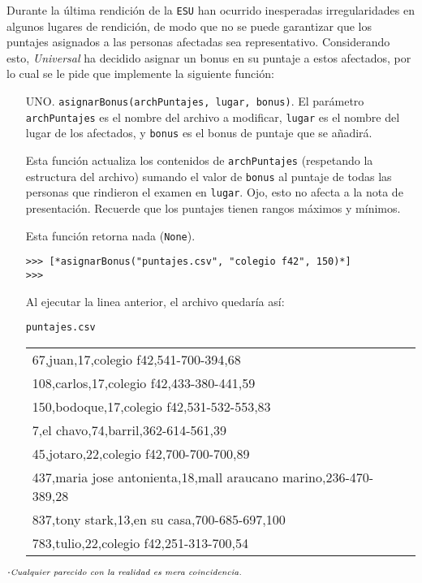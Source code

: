 Durante la última rendición de la \texttt{ESU} han ocurrido inesperadas irregularidades en algunos lugares de rendición, de modo que no se puede garantizar que los puntajes asignados a las personas afectadas sea representativo. Considerando esto, \textit{Universal} ha decidido asignar un bonus en su puntaje a estos afectados, por lo cual se le pide que implemente la siguiente función:
\begin{enumerate}
    \item[UNO.] \texttt{asignarBonus(archPuntajes, lugar, bonus)}. El parámetro \texttt{archPuntajes} es el nombre del archivo a modificar, \texttt{lugar} es el nombre del lugar de los afectados, y \texttt{bonus} es el bonus de puntaje que se añadirá.
    
    Esta función actualiza los contenidos de \texttt{archPuntajes} (respetando la estructura del archivo) sumando el valor de \texttt{bonus} al puntaje de todas las personas que rindieron el examen en \texttt{lugar}. Ojo, esto no afecta a la nota de presentación. Recuerde que los puntajes tienen rangos máximos y mínimos.
    
    Esta función retorna nada (\texttt{None}).

\begin{lstlisting}[style=consola]
>>> [*asignarBonus("puntajes.csv", "colegio f42", 150)*]
>>> 
\end{lstlisting}

Al ejecutar la linea anterior, el archivo quedaría así:

\begin{center}
\texttt{puntajes.csv}\\
	\begin{tabular}{|l|}
		\hline
67,juan,17,colegio f42,541-700-394,68\\
108,carlos,17,colegio f42,433-380-441,59\\
150,bodoque,17,colegio f42,531-532-553,83\\
7,el chavo,74,barril,362-614-561,39\\
45,jotaro,22,colegio f42,700-700-700,89\\
437,maria jose antonienta,18,mall araucano marino,236-470-389,28\\
837,tony stark,13,en su casa,700-685-697,100\\
783,tulio,22,colegio f42,251-313-700,54\\
		\hline
	\end{tabular}
\end{center}


\end{enumerate}


\begin{flushright}
$._\text{\textit{Cualquier parecido con la realidad es mera coincidencia.}}$
\end{flushright}
